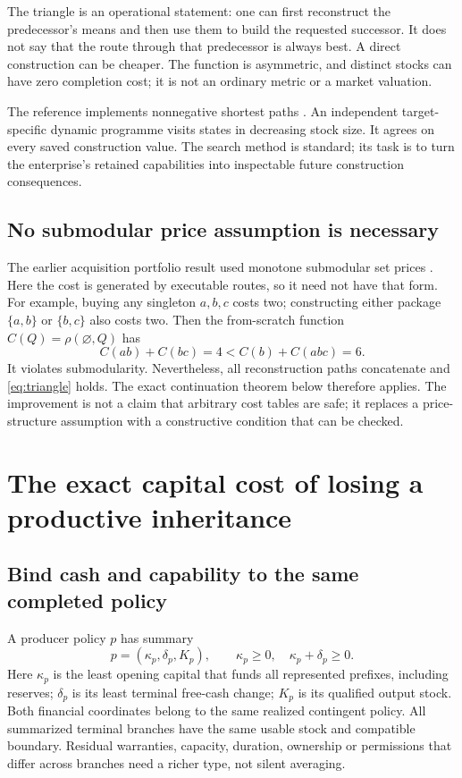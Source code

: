 \documentclass[11pt,letterpaper]{article}
\theoremstyle{definition}\newtheorem{definition}[theorem]{Definition}
\theoremstyle{remark}\newtheorem{remark}[theorem]{Remark}
\begin{document}
The triangle is an operational statement: one can first reconstruct the predecessor's means and then use them to build the requested successor. It does not say that the route through that predecessor is always best. A direct construction can be cheaper. The function is asymmetric, and distinct stocks can have zero completion cost; it is not an ordinary metric or a market valuation.

The reference implements nonnegative shortest paths \cite{dijkstra}. An independent target-specific dynamic programme visits states in decreasing stock size. It agrees on every saved construction value. The search method is standard; its task is to turn the enterprise's retained capabilities into inspectable future construction consequences.

\subsection{No submodular price assumption is necessary}
The earlier acquisition portfolio result used monotone submodular set prices \cite{strategise}. Here the cost is generated by executable routes, so it need not have that form. For example, buying any singleton $a,b,c$ costs two; constructing either package $\{a,b\}$ or $\{b,c\}$ also costs two. Then the from-scratch function $C(Q)=\rho(\varnothing,Q)$ has
\begin{equation}
 C(ab)+C(bc)=4 < C(b)+C(abc)=6.
 \label{eq:nonsubmod}
\end{equation}
It violates submodularity. Nevertheless, all reconstruction paths concatenate and \eqref{eq:triangle} holds. The exact continuation theorem below therefore applies. The improvement is not a claim that arbitrary cost tables are safe; it replaces a price-structure assumption with a constructive condition that can be checked.

\section{The exact capital cost of losing a productive inheritance}
\subsection{Bind cash and capability to the same completed policy}
A producer policy $p$ has summary
\begin{equation}
 p=(\kappa_p,\delta_p,K_p),\qquad \kappa_p\ge0,\quad\kappa_p+\delta_p\ge0.
 \label{eq:producer}
\end{equation}
Here $\kappa_p$ is the least opening capital that funds all represented prefixes, including reserves; $\delta_p$ is its least terminal free-cash change; $K_p$ is its qualified output stock. Both financial coordinates belong to the same realized contingent policy. All summarized terminal branches have the same usable stock and compatible boundary. Residual warranties, capacity, duration, ownership or permissions that differ across branches need a richer type, not silent averaging.
\end{document}
